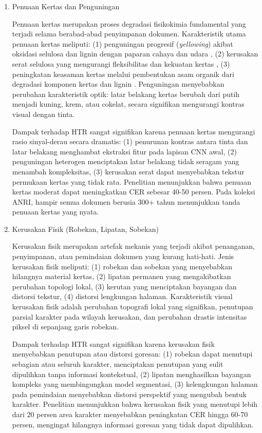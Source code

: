 \documentclass[12pt,a4paper]{article}
\begin{document}
\begin{enumerate}[leftmargin=*, labelindent=0pt, itemsep=1ex, topsep=0pt]
\item Penuaan Kertas dan Penguningan
\label{para:penuaan-kertas}

Penuaan kertas merupakan proses degradasi fisikokimia fundamental yang terjadi selama berabad-abad penyimpanan dokumen. Karakteristik utama penuaan kertas meliputi: (1) penguningan progresif (\textit{yellowing}) akibat oksidasi selulosa dan lignin dengan paparan cahaya dan udara \parencite{reilly1993}, (2) kerusakan serat selulosa yang mengurangi fleksibilitas dan kekuatan kertas \parencite{porck2000}, (3) peningkatan keasaman kertas melalui pembentukan asam organik dari degradasi komponen kertas dan lignin \parencite{neevel1995}. Penguningan menyebabkan perubahan karakteristik optik: latar belakang kertas berubah dari putih menjadi kuning, krem, atau cokelat, secara signifikan mengurangi kontras visual dengan tinta.

Dampak terhadap HTR sangat signifikan karena penuaan kertas mengurangi rasio sinyal-derau secara dramatis: (1) penurunan kontras antara tinta dan latar belakang menghambat ekstraksi fitur pada lapisan CNN awal, (2) penguningan heterogen menciptakan latar belakang tidak seragam yang menambah kompleksitas, (3) kerusakan serat dapat menyebabkan tekstur permukaan kertas yang tidak rata. Penelitian \parencite{gatos2006} menunjukkan bahwa penuaan kertas moderat dapat meningkatkan CER sebesar 40-50 persen. Pada koleksi ANRI, hampir semua dokumen berusia 300+ tahun menunjukkan tanda penuaan kertas yang nyata.

\item Kerusakan Fisik (Robekan, Lipatan, Sobekan)
\label{para:kerusakan-fisik}

Kerusakan fisik merupakan artefak mekanis yang terjadi akibat penanganan, penyimpanan, atau pemindaian dokumen yang kurang hati-hati. Jenis kerusakan fisik meliputi: (1) robekan dan sobekan yang menyebabkan hilangnya material kertas, (2) lipatan permanen yang mengakibatkan perubahan topologi lokal, (3) kerutan yang menciptakan bayangan dan distorsi tekstur, (4) distorsi lengkungan halaman. Karakteristik visual kerusakan fisik adalah perubahan topografi lokal yang signifikan, penutupan parsial karakter pada wilayah kerusakan, dan perubahan drastis intensitas piksel di sepanjang garis robekan.

Dampak terhadap HTR sangat signifikan karena kerusakan fisik menyebabkan penutupan atau distorsi goresan: (1) robekan dapat menutupi sebagian atau seluruh karakter, menciptakan penutupan yang sulit dipulihkan tanpa informasi kontekstual, (2) lipatan menghasilkan bayangan kompleks yang membingungkan model segmentasi, (3) kelengkungan halaman pada pemindaian menyebabkan distorsi perspektif yang mengubah bentuk karakter. Penelitian menunjukkan bahwa kerusakan fisik yang menutupi lebih dari 20 persen area karakter menyebabkan peningkatan CER hingga 60-70 persen, mengingat hilangnya informasi goresan yang tidak dapat dipulihkan.


\end{enumerate}
\end{document}
